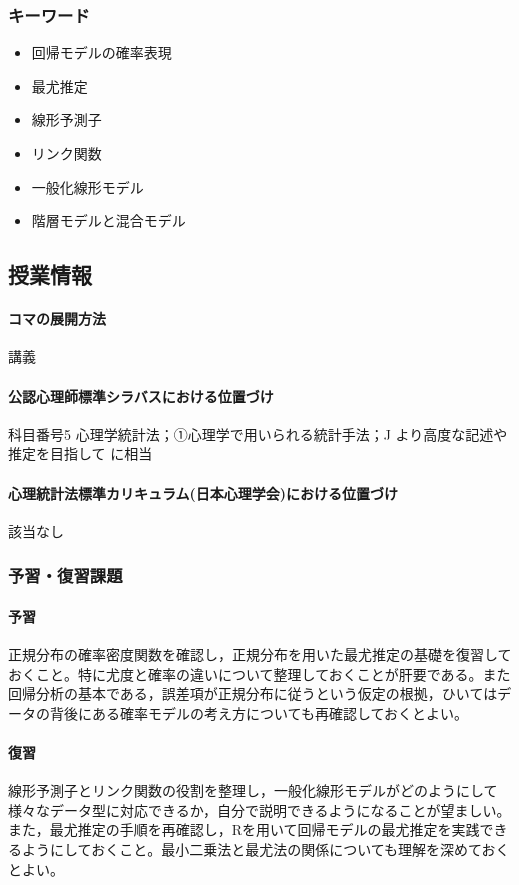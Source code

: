 \subsubsection{キーワード}
\begin{itemize}
	\item 回帰モデルの確率表現
	\item 最尤推定
	\item 線形予測子
	\item リンク関数
	\item 一般化線形モデル
	\item 階層モデルと混合モデル
\end{itemize}
\subsection{授業情報}
\paragraph{コマの展開方法}
講義
\paragraph{公認心理師標準シラバスにおける位置づけ}
科目番号5 心理学統計法；①心理学で用いられる統計手法；J より高度な記述や推定を目指して に相当
\paragraph{心理統計法標準カリキュラム(日本心理学会)における位置づけ}
該当なし
\subsubsection{予習・復習課題}
\paragraph{予習}
正規分布の確率密度関数を確認し，正規分布を用いた最尤推定の基礎を復習しておくこと。特に尤度と確率の違いについて整理しておくことが肝要である。また回帰分析の基本である，誤差項が正規分布に従うという仮定の根拠，ひいてはデータの背後にある確率モデルの考え方についても再確認しておくとよい。
\paragraph{復習}
  線形予測子とリンク関数の役割を整理し，一般化線形モデルがどのようにして様々なデータ型に対応できるか，自分で説明できるようになることが望ましい。また，最尤推定の手順を再確認し，Rを用いて回帰モデルの最尤推定を実践できるようにしておくこと。最小二乗法と最尤法の関係についても理解を深めておくとよい。